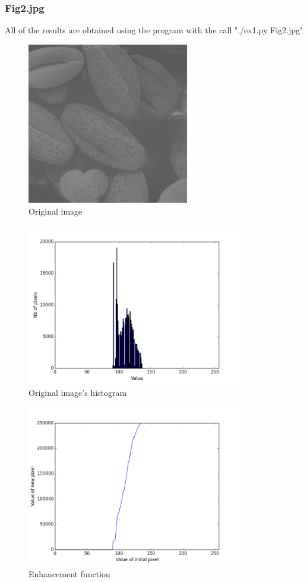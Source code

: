 \documentclass[10pt]{article}
\begin{document}
\subsubsection{Fig2.jpg}
All of the results are obtained using the program with the call "./ex1.py Fig2.jpg"
\begin{figure}[!ht]
	\centering
	\includegraphics[height=200pt]{./ex1/Fig2.jpg}
	\caption{Original image}
\end{figure}
\begin{figure}[!ht]
	\centering
	\includegraphics[height=200pt]{./ex1/Fig2_hist.png}
	\caption{Original image's histogram}
\end{figure}
\begin{figure}[!ht]
	\centering
	\includegraphics[height=200pt]{./ex1/Fig2_cdf.png}
	\caption{Enhancement function}
\end{figure}
\end{document}

